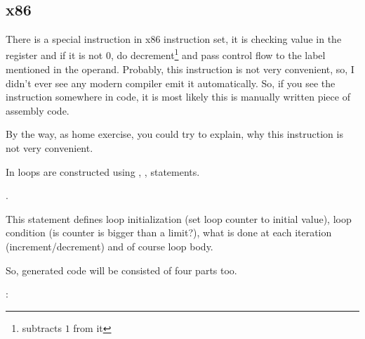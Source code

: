 ﻿\subsection{x86}

{There is a special \LOOP instruction in x86 instruction set, it is checking value in the \ECX register and 
if it is not $0$, do \ECX decrement\footnote{subtracts $1$ from it} 
and pass control flow to the label mentioned in the \LOOP operand. 
Probably, this instruction is not very convenient, so, I didn't ever see any modern compiler emit it automatically.
So, if you see the instruction somewhere in code, it is most likely this is manually written piece of assembly code.}

{By the way, as home exercise, you could try to explain, why this instruction is not very convenient.}

{In \CCpp loops are constructed using , ,  statements.}

 .

{This statement defines loop initialization (set loop counter to initial value), 
loop condition (is counter is bigger than a limit?), what is done at each iteration (increment/decrement) 
and of course loop body.}

\IFRU{}{}

{So, generated code will be consisted of four parts too}.

:


